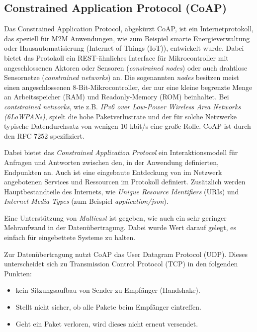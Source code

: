 \subsection{Constrained Application Protocol (CoAP)}
\label{subsec:constrained-application-protocol}
Das Constrained Application Protocol, abgekürzt CoAP, ist ein Internetprotokoll, das speziell für M2M Anwendungen, wie zum Beispiel smarte Energieverwaltung oder Hausautomatisierung (Internet of Things (IoT)), entwickelt wurde. Dabei bietet das Protokoll ein REST-ähnliches Interface für Mikrocontroller mit angeschlossenen Aktoren oder Sensoren (\textit{constrained nodes}) oder auch drahtlose Sensornetze (\textit{constrained networks}) an. Die sogenannten \textit{nodes} besitzen meist einen angeschlossenen 8-Bit-Mikrocontroller, der nur eine kleine begrenzte Menge an Arbeitsspeicher (RAM) und Readonly-Memory (ROM) beinhaltet. Bei \textit{contstrained networks}, wie z.B. \textit{IPv6 over Low-Power Wireless Area Networks (6LoWPANs)}, spielt die hohe Paketverlustrate und der für solche Netzwerke typische Datendurchsatz von wenigen 10 kbit/s eine große Rolle. CoAP ist durch den RFC 7252 \autocite{RFC7252} spezifiziert.

Dabei bietet das \textit{Constrained Application Protocol} ein Interaktionsmodell für Anfragen und Antworten zwischen den, in der Anwendung definierten, Endpunkten an. Auch ist eine eingebaute Entdeckung von im Netzwerk angebotenen Services und Ressourcen im Protokoll definiert. Zusätzlich werden Hauptbestandteile des Internets, wie \textit{Unique Resource Identifiers} (URIs) und \textit{Internet Media Types} (zum Beispiel \textit{application/json}).

Eine Unterstützung von \textit{Multicast} ist gegeben, wie auch ein sehr geringer Mehraufwand in der Datenübertragung. Dabei wurde Wert darauf gelegt, es einfach für eingebettete Systeme zu halten.  

Zur Datenübertragung nutzt CoAP das User Datagram Protocol (UDP). Dieses unterscheidet sich zu Transmission Control Protocol (TCP) in den folgenden Punkten:
\begin{itemize}
    \item kein Sitzungsaufbau von Sender zu Empfänger (Handshake).
    \item Stellt nicht sicher, ob alle Pakete beim Empfänger eintreffen.
    \item Geht ein Paket verloren, wird dieses nicht erneut versendet.
\end{itemize}

